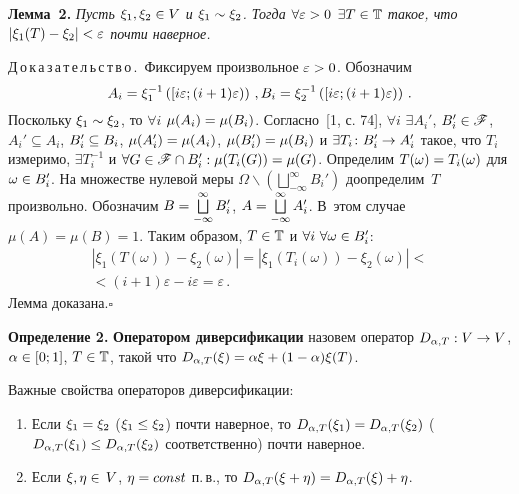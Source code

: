 \begin{multicols}{2}
\columnbreak

\noindent

\textbf{Лемма~2.}
\textit{Пусть $\xi_1, \xi_2 \hm\in V $ и $\xi_1 \hm\sim \xi_2$. Тогда
$ \forall \eps \hm> 0$ $\exists  T \hm\in \classT$ такое, что $
|\xi_1(T)\hm-\xi_2|\hm<\eps $ почти наверное.} 

\medskip

\noindent
Д\,о\,к\,а\,з\,а\,т\,е\,л\,ь\,с\,т\,в\,о\,.\ Фиксируем произвольное
$\eps \hm> 0 $. Обозначим
$$
A_i = \xi_1^{-1}\left(  \left[  i \varepsilon ; (i+1) \varepsilon \right) \right )\,,  \\
B_i = \xi_2^{-1}\left( \left [  i \varepsilon ; (i+1) \varepsilon \right ) \right )\,.
$$
Поскольку $\xi_1 \hm\sim \xi_2$, то $\forall i$  $\mu(A_i) \hm=
\mu(B_i)$. Согласно~[1, с. 74], $\forall i$ $\exists
A_i'$, $B_i' \hm\in \sigmaF$, $A_i' \subseteq A_i$,
$B_i' \hm\subseteq B_i$, $\mu(A_i') \hm= \mu(A_i)$, $\mu(B_i')\hm =
\mu(B_i)$ и $\exists T_i \colon B_i' \hm\to A_i'$ такое, что $T_i$
измеримо, $\exists T_i^{-1}$ и $\forall G \hm\in \sigmaF \cap B_i': 
\mu(T_i(G)) \hm= \mu(G)$. Определим $T(\omega) \hm= T_i(\omega)$ для 
$\omega \hm\in B_i'$. На множестве нулевой меры $\Omega
\backslash (\bigsqcup\limits_{-\infty}^\infty B_i')$ доопределим~$T$ 
произвольно. Обозначим $B \hm= \bigsqcup\limits_{-\infty}^\infty
B_i'$, $A \hm= \bigsqcup\limits_{-\infty}^\infty A_i'$. В~этом случае
$\mu(A) = \mu(B) = 1$. Таким образом, $T \hm\in \classT$ и $\forall i
\ \forall \omega \hm\in B_i' $:
\begin{multline*}
| \xi_1(T(\omega)) - \xi_2(\omega) | = | \xi_1(T_i(\omega)) -
\xi_2(\omega) | <{}\\
{}< (i+1) \varepsilon - i \varepsilon =
\varepsilon\,.
\end{multline*} 
Лемма доказана.\hfill$\square$ 

\medskip

\noindent
\textbf{Определение 2.}
\textbf{Оператором диверсификации} назовем оператор
$D_{\alpha,T} : V \hm\rightarrow V$, $\alpha \hm\in [0;1]$, $T \hm\in \classT$,
такой что $D_{\alpha,T}(\xi) \hm= \alpha \xi \hm+ ( 1 \hm- \alpha ) \xi(T)$.

Важные свойства операторов диверсификации:
\begin{enumerate}
\item Если $\xi_1 \hm= \xi_2$ ($\xi_1 \hm\le \xi_2$) почти наверное, то
$D_{\alpha,T}(\xi_1) \hm= D_{\alpha,T}(\xi_2)$ 
($D_{\alpha,T}(\xi_1) \hm\le D_{\alpha,T}(\xi_2)$  соответственно)
 почти наверное.
\item Если $\xi,\eta\hm\in\,V$, $\eta\hm=const$ п.\,в., 
то $D_{\alpha,T}(\xi+\eta) \hm= D_{\alpha,T}(\xi) \hm+ \eta$.
\end{enumerate}


\end{multicols}
